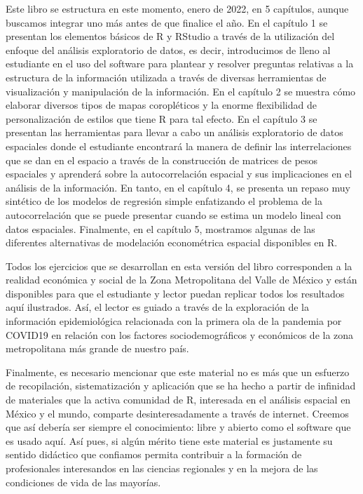 \documentclass[
  11pt,
  oneside]{book}
\begin{document}
Este libro se estructura en este momento, enero de 2022, en 5 capítulos, aunque buscamos integrar uno más antes de que finalice el año. En el capítulo 1 se presentan los elementos básicos de R y RStudio a través de la utilización del enfoque del análisis exploratorio de datos, es decir, introducimos de lleno al estudiante en el uso del software para plantear y resolver preguntas relativas a la estructura de la información utilizada a través de diversas herramientas de visualización y manipulación de la información. En el capítulo 2 se muestra cómo elaborar diversos tipos de mapas coropléticos y la enorme flexibilidad de personalización de estilos que tiene R para tal efecto. En el capítulo 3 se presentan las herramientas para llevar a cabo un análisis exploratorio de datos espaciales donde el estudiante encontrará la manera de definir las interrelaciones que se dan en el espacio a través de la construcción de matrices de pesos espaciales y aprenderá sobre la autocorrelación espacial y sus implicaciones en el análisis de la información. En tanto, en el capítulo 4, se presenta un repaso muy sintético de los modelos de regresión simple enfatizando el problema de la autocorrelación que se puede presentar cuando se estima un modelo lineal con datos espaciales. Finalmente, en el capítulo 5, mostramos algunas de las diferentes alternativas de modelación econométrica espacial disponibles en R.

Todos los ejercicios que se desarrollan en esta versión del libro corresponden a la realidad económica y social de la Zona Metropolitana del Valle de México y están disponibles para que el estudiante y lector puedan replicar todos los resultados aquí ilustrados. Así, el lector es guiado a través de la exploración de la información epidemiológica relacionada con la primera ola de la pandemia por COVID19 en relación con los factores sociodemográficos y económicos de la zona metropolitana más grande de nuestro país.

Finalmente, es necesario mencionar que este material no es más que un esfuerzo de recopilación, sistematización y aplicación que se ha hecho a partir de infinidad de materiales que la activa comunidad de R, interesada en el análisis espacial en México y el mundo, comparte desinteresadamente a través de internet. Creemos que así debería ser siempre el conocimiento: libre y abierto como el software que es usado aquí. Así pues, si algún mérito tiene este material es justamente su sentido didáctico que confiamos permita contribuir a la formación de profesionales interesandos en las ciencias regionales y en la mejora de las condiciones de vida de las mayorías.
\end{document}
